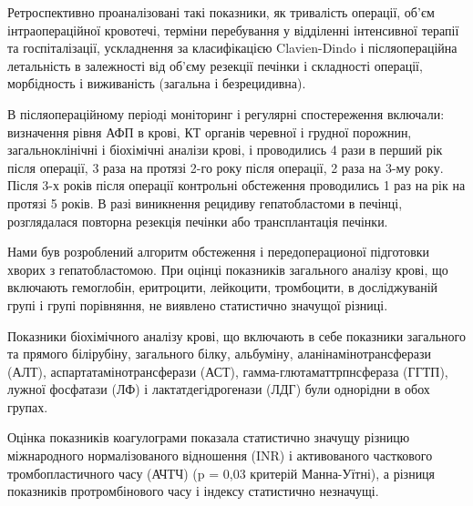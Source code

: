 Ретроспективно проаналізовані такі показники, як тривалість операції, об’єм інтраопераційної кровотечі, терміни перебування у відділенні інтенсивної терапії та госпіталізації, ускладнення за класифікацією Clavien-Dindo і післяопераційна летальність в залежності від об’єму резекції печінки і складності операції, морбідность і виживаність (загальна і безрецидивна). 

В післяопераційному періоді моніторинг і регулярні спостереження включали: визначення рівня АФП в крові, КТ органів черевної і грудної порожнин, загальноклінічні і біохімічні аналізи крові, і проводились 4 рази в перший рік після операції, 3 раза на протязі 2-го року після операції, 2 раза на 3-му року. Після 3-х років після операції контрольні обстеження проводились 1 раз на рік на протязі 5 років. В разі виникнення рецидиву гепатобластоми в печінці, розглядалася повторна резекція печінки або трансплантація печінки.



Нами був розроблений алгоритм обстеження і передоперационої підготовки хворих з гепатобластомою.
При оцінці показників загального аналізу крові, що включають гемоглобін, еритроцити, лейкоцити, тромбоцити, в досліджуваній групі і групі порівняння, не виявлено статистично значущої різниці.

Показники біохімічного аналізу крові, що включають в себе показники загального та прямого білірубіну, загального білку, альбуміну, аланінамінотрансферази (АЛТ), аспартатамінотрансферази (АСТ), гамма-глютаматтрпнсфераза (ГГТП), лужної фосфатази (ЛФ) і лактатдегідрогенази (ЛДГ) були однорідни в обох групах.

Оцінка показників коагулограми показала статистично значущу різницю міжнародного нормалізованого відношення (INR) і активованого часткового тромбопластичного часу (АЧТЧ) (p = 0,03 критерій Манна-Уїтні), а різниця показників протромбінового часу і індексу статистично незначущі. 


